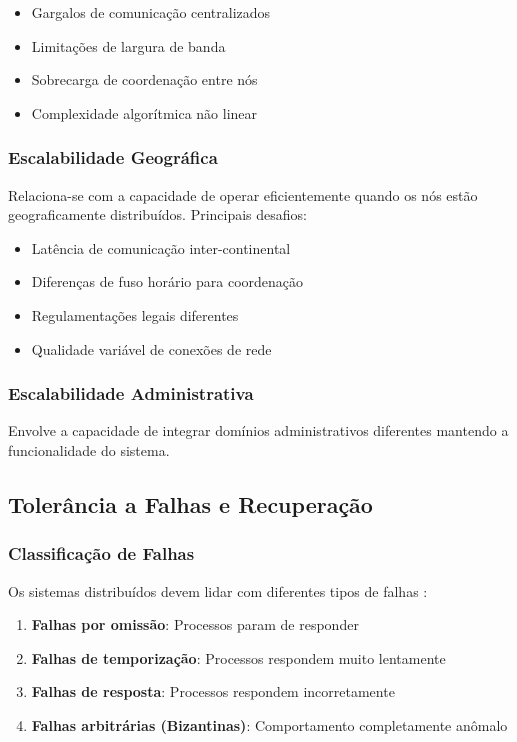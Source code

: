 \begin{itemize}
    \item Gargalos de comunicação centralizados
    \item Limitações de largura de banda
    \item Sobrecarga de coordenação entre nós
    \item Complexidade algorítmica não linear
\end{itemize}

\subsubsection{Escalabilidade Geográfica}

Relaciona-se com a capacidade de operar eficientemente quando os nós estão geograficamente distribuídos. Principais desafios:

\begin{itemize}
    \item Latência de comunicação inter-continental
    \item Diferenças de fuso horário para coordenação
    \item Regulamentações legais diferentes
    \item Qualidade variável de conexões de rede
\end{itemize}

\subsubsection{Escalabilidade Administrativa}

Envolve a capacidade de integrar domínios administrativos diferentes mantendo a funcionalidade do sistema.

\subsection{Tolerância a Falhas e Recuperação}

\subsubsection{Classificação de Falhas}

Os sistemas distribuídos devem lidar com diferentes tipos de falhas \cite{coulouris2013sistemas}:

\begin{enumerate}
    \item \textbf{Falhas por omissão}: Processos param de responder
    \item \textbf{Falhas de temporização}: Processos respondem muito lentamente
    \item \textbf{Falhas de resposta}: Processos respondem incorretamente
    \item \textbf{Falhas arbitrárias (Bizantinas)}: Comportamento completamente anômalo
\end{enumerate}

